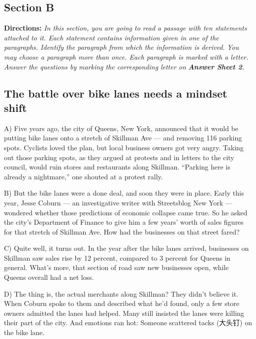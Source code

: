 \documentclass[UTF8,11pt]{ctexart}
\begin{document}
\subsection*{\textbf{Section B}}


\textbf{Directions:} \textit{In this section, you are going to read a passage with ten statements attached to it. Each statement} \textit{contains information given in one of the paragraphs. Identify the paragraph from which the information is derived.} \textit{You may choose a paragraph more than once. Each paragraph is marked with a letter. Answer the questions by} \textit{marking the corresponding letter on }\textbf{\textit{Answer Sheet 2}}\textit{.}


\subsection*{\textbf{The battle over bike lanes needs a mindset shift}}


A) Five years ago, the city of Queens, New York, announced that it would be putting bike lanes onto a stretch of Skillman Ave — and removing 116 parking spots. Cyclists loved the plan, but local business owners got very angry. Taking out those parking spots, as they argued at protests and in letters to the city council, would ruin stores and restaurants along Skillman. “Parking here is already a nightmare,” one shouted at a protest rally.


B) But the bike lanes were a done deal, and soon they were in place. Early this year, Jesse Coburn — an investigative writer with Streetsblog New York — wondered whether those predictions of economic collapse came true. So he asked the city’s Department of Finance to give him a few years’ worth of sales figures for that stretch of Skillman Ave. How had the businesses on that street fared?


C) Quite well, it turns out. In the year after the bike lanes arrived, businesses on Skillman saw sales rise by 12 percent, compared to 3 percent for Queens in general. What’s more, that section of road saw new businesses open, while Queens overall had a net loss.


D) The thing is, the actual merchants along Skillman? They didn’t believe it. When Coburn spoke to them and described what he’d found, only a few store owners admitted the lanes had helped. Many still insisted the lanes were killing their part of the city. And emotions ran hot: Someone scattered tacks (大头钉) on the bike lane.
\end{document}
